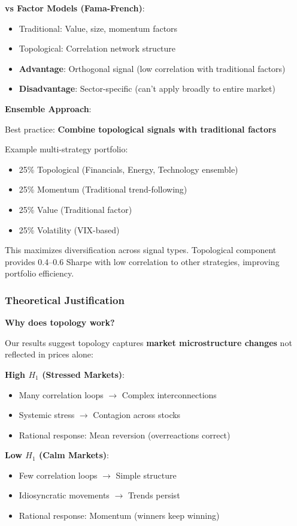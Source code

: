 \textbf{vs Factor Models (Fama-French)}:
\begin{itemize}
\item Traditional: Value, size, momentum factors
\item Topological: Correlation network structure
\item \textbf{Advantage}: Orthogonal signal (low correlation with traditional factors)
\item \textbf{Disadvantage}: Sector-specific (can't apply broadly to entire market)
\end{itemize}

\textbf{Ensemble Approach}:

Best practice: \textbf{Combine topological signals with traditional factors}

Example multi-strategy portfolio:
\begin{itemize}
\item 25\% Topological (Financials, Energy, Technology ensemble)
\item 25\% Momentum (Traditional trend-following)
\item 25\% Value (Traditional factor)
\item 25\% Volatility (VIX-based)
\end{itemize}

This maximizes diversification across signal types. Topological component provides 0.4--0.6 Sharpe with low correlation to other strategies, improving portfolio efficiency.

\subsubsection{Theoretical Justification}

\textbf{Why does topology work?}

Our results suggest topology captures \textbf{market microstructure changes} not reflected in prices alone:

\textbf{High $H_1$ (Stressed Markets)}:
\begin{itemize}
\item Many correlation loops $\rightarrow$ Complex interconnections
\item Systemic stress $\rightarrow$ Contagion across stocks
\item Rational response: Mean reversion (overreactions correct)
\end{itemize}

\textbf{Low $H_1$ (Calm Markets)}:
\begin{itemize}
\item Few correlation loops $\rightarrow$ Simple structure
\item Idiosyncratic movements $\rightarrow$ Trends persist
\item Rational response: Momentum (winners keep winning)
\end{itemize}

